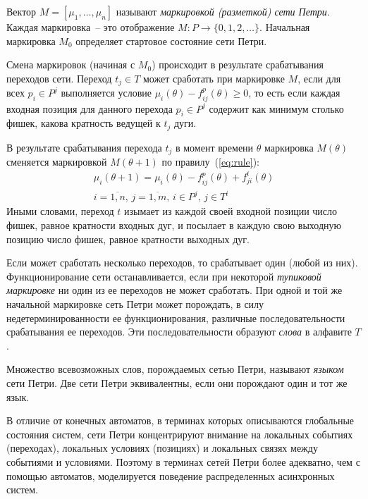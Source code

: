 Вектор ${M = [\mu_1, \dots, \mu_n]}$ называют \textit{маркировкой (разметкой) сети Петри}. Каждая маркировка~-- это отображение ${M\colon P\rightarrow \{0, 1, 2, \dots \}}$. Начальная маркировка $M_0$ определяет стартовое состояние сети Петри.

Смена маркировок (начиная с $M_0$) происходит в результате срабатывания переходов сети. Переход ${t_j\in T}$ может сработать при маркировке $M$, если для всех ${p_i\in P^j}$ выполняется условие ${\mu_i(\theta) - f_{ij}^p(\theta)\geqslant 0}$, то есть если каждая входная позиция для данного перехода ${p_i\in P^j}$ содержит как минимум столько фишек, какова кратность ведущей к $t_j$ дуги.

В результате срабатывания перехода $t_j$ в момент времени $\theta$ маркировка $M(\theta)$ сменяется маркировкой $M(\theta + 1)$ по правилу~(\ref{eq:rule}):
%
\begin{equation}
    \label{eq:rule}
\begin{gathered}
    \mu_i(\theta + 1) = \mu_i(\theta) - f_{ij}^p(\theta) + f_{ji}^t(\theta)\\
    i = \overline{1, n},\, j = \overline{1, m},\, i\in P^j,\, j\in T^i
\end{gathered}
\end{equation}
%
Иными словами, переход $t$ изымает из каждой своей входной позиции число фишек, равное кратности входных дуг, и посылает в каждую свою выходную позицию число фишек, равное кратности выходных дуг.

Если может сработать несколько переходов, то срабатывает один (любой из них). Функционирование сети останавливается, если при некоторой \textit{тупиковой маркировке} ни один из ее переходов не может сработать. При одной и той же начальной маркировке сеть Петри может порождать, в силу недетерминированности ее функционирования, различные последовательности срабатывания ее переходов. Эти последовательности образуют \textit{слова} в алфавите $T$.

Множество всевозможных слов, порождаемых сетью Петри, называют \textit{языком} сети Петри. Две сети Петри эквивалентны, если они порождают один и тот же язык.

В отличие от конечных автоматов, в терминах которых описываются глобальные состояния систем, сети Петри концентрируют внимание на локальных событиях (переходах), локальных условиях (позициях) и локальных связях между событиями и условиями. Поэтому в терминах сетей Петри более адекватно, чем с помощью автоматов, моделируется поведение распределенных асинхронных систем.

